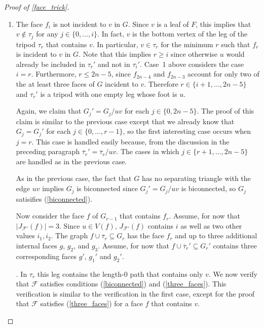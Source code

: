 \documentclass{patmorin}
\begin{document}
\begin{proof}[Proof of \cref{face_trick}]
\begin{enumerate}
    Since $G_j'=G_j/uv$, there is an injective function from the faces of $G_j'$ onto the faces of $G_j$.  Therefore, for any face $f\not\in\{f_{2n-3},f_{2n-4}\}$ of $G_j$ there is a corresponding face $f'$ of $G_j'$.  It is straightforward to verify that $J_\mathcal{F}(f)=J_\mathcal{F'}(f')$ and therefore $f$ satisfies (\ref{three_faces}) since $f'$ satisfies (\ref{three_faces}).
    
    \item The face $f_i$ is not incident to $v$ in $G$.  Since $v$ is a leaf of $F$, this implies that $v\not\in \tau_j$ for any $j\in\{0,\ldots,i\}$.  In fact, $v$ is the bottom vertex of the leg of the tripod $\tau_r$ that contains $v$.  In particular, $v\in\tau_r$ for the minimum $r$ such that $f_r$ is incident to $v$ in $G$.  Note that this implies $r\ge i$ since otherwise $u$ would already be included in $\tau_r'$ and not in $\tau_i'$. Case~1 above considers the case $i=r$.  Furthermore, $r\le 2n-5$, since  $f_{2n-4}$ and $f_{2n-3}$ account for only two of the at least three faces of $G$ incident to $v$.  Therefore $r\in\{i+1,\ldots,2n-5\}$ and $\tau_r'$ is a tripod with one empty leg whose foot is $u$.
    
    Again, we claim that $G_j'=G_j/uv$ for each $j\in\{0,2n-5\}$.  The proof of this claim is similar to the previous case except that we already know that $G_j=G_j'$ for each $j\in\{0,\ldots,r-1\}$, so the first interesting case occurs when $j=r$. This case is handled easily because, from the discussion in the preceding paragraph $\overline{\tau}_r'=\overline{\tau}_r/uv$.  The cases in which $j\in\{r+1,\ldots,2n-5\}$ are handled as in the previous case.

    As in the previous case, the fact that $G$ has no separating triangle with the edge $uv$ implies $G_j$ is biconnected since $G_j'=G_j/uv$ is biconnected, so $G_j$ satisifies (\ref{biconnected}).
    
    Now consider the face $f$ of $G_{r-1}$ that contains $f_r$.  Assume, for now that $|J_{\mathcal{F'}}(f)|=3$.  Since $u\in V(f)$, $J_{\mathcal{F'}}(f)$ contains $i$ as well as two other values $i_1,i_2$.  The graph $f\cup\overline{\tau}_r\subseteq G_r$ has the face $f_r$ and up to three additional internal faces $g$, $g_2$, and $g_3$.  Assume, for now that $f\cup\overline{\tau}_r'\subseteq G_r'$ contains three corresponding faces $g'$, $g_1'$ and $g_2'$.  
    
    
    
    
    
    
    .  In $\tau_r$ this leg contains the length-$0$ path that contains only $v$.  We now verify that $\mathcal{F}$ satisfies conditions (\ref{biconnected}) and (\ref{three_faces}).  This verification is similar to the verification in the first case, except for the proof that $\mathcal{F}$ satisfies (\ref{three_faces}) for a face $f$ that contains $v$.


\end{enumerate}
\end{proof}
\end{document}
